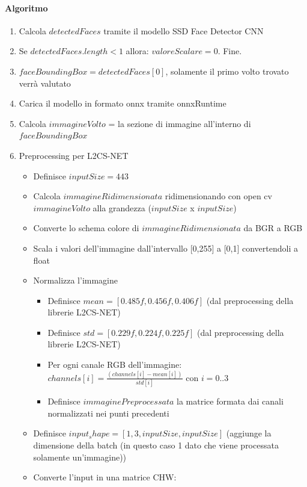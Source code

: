 \documentclass[12pt,a4paper,openright,twoside]{book}
\begin{document}
\paragraph{Algoritmo}
\begin{enumerate}
    \item Calcola \(detectedFaces\) tramite il modello SSD Face Detector CNN
    \item Se \(detectedFaces.length < 1\) allora: \(valoreScalare = 0\). Fine.
    \item \(faceBoundingBox = detectedFaces[0]\), solamente il primo volto trovato verrà valutato
    \item Carica il modello in formato onnx tramite onnxRuntime
    \item Calcola \(immagineVolto\) = la sezione di immagine all'interno di \(faceBoundingBox\)
    \item Preprocessing per L2CS-NET \begin{itemize}
        \item Definisce \(inputSize = 443\)
        \item Calcola \(immagineRidimensionata\) ridimensionando con open cv \(immagineVolto\) alla grandezza (\(inputSize\) x \(inputSize\))
        \item Converte lo schema colore di \(immagineRidimensionata\) da BGR a RGB
        \item Scala i valori dell'immagine dall'intervallo [0,255] a [0,1] convertendoli a float
        \item Normalizza l'immagine \begin{itemize}
            \item Definisce \(mean = [0.485f, 0.456f, 0.406f]\) (dal preprocessing della librerie L2CS-NET)
            \item Definisce \(std = [0.229f, 0.224f, 0.225f]\) (dal preprocessing della librerie L2CS-NET)
            \item Per ogni canale RGB dell'immagine: \(channels[i] = \frac{(channels[i] - mean[i])}{std[i]}\) con \(i = 0..3\)
            \item Definisce \(immaginePreprocessata\) la matrice formata dai canali normalizzati nei punti precedenti
        \end{itemize}
        \item Definisce \(input_shape = [1, 3, inputSize, inputSize]\) (aggiunge la dimensione della batch (in questo caso 1 dato che viene processata solamente un'immagine))
        \item Converte l'input in una matrice CHW: \begin{itemize}

\end{itemize}
\end{itemize}
\end{enumerate}
\end{document}
